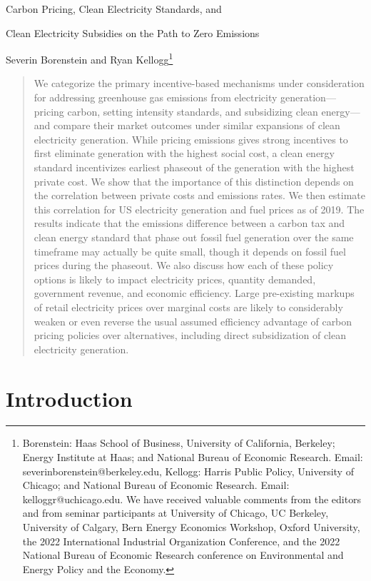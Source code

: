 \documentclass[12pt]{article}
\begin{document}
\centerline{\Large Carbon Pricing, Clean Electricity Standards, and }
\centerline{\Large Clean Electricity Subsidies on the Path to Zero Emissions}
\bigskip
\centerline{\large Severin Borenstein and Ryan Kellogg\footnote{Borenstein: Haas School of Business, University of California, Berkeley; Energy Institute at
Haas; and National Bureau of Economic Research. Email: severinborenstein@berkeley.edu, Kellogg: Harris Public Policy, University of Chicago; and National Bureau of Economic Research. Email: kelloggr@uchicago.edu. We have received valuable comments from the editors and from seminar participants at University of Chicago, UC Berkeley, University of Calgary, Bern Energy Economics Workshop, Oxford University, the 2022 International Industrial Organization Conference, and the 2022 National Bureau of Economic Research conference on Environmental and Energy Policy and the Economy.}}
\bigskip

\begin{abstract}
We categorize the primary incentive-based mechanisms under consideration for addressing greenhouse gas emissions from electricity generation---pricing carbon, setting intensity standards, and subsidizing clean energy---and compare their market outcomes under similar expansions of clean electricity generation. While pricing emissions gives strong incentives to first eliminate generation with the highest social cost, a clean energy standard incentivizes earliest phaseout of the generation with the highest private cost. We show that  the importance of this distinction depends on the correlation between private costs and emissions rates. We then estimate this correlation for US electricity generation and fuel prices as of 2019. The results indicate that the emissions difference between a carbon tax and clean energy standard that phase out fossil fuel generation over the same timeframe may actually be quite small, though it depends on fossil fuel prices during the phaseout. We also discuss how each of these policy options is likely to impact electricity prices, quantity demanded, government revenue, and economic efficiency. Large pre-existing markups of retail electricity prices over marginal costs are likely to considerably weaken or even reverse the usual assumed efficiency advantage of carbon pricing policies over alternatives, including direct subsidization of clean electricity generation.
\end{abstract}

\newpage
\section{Introduction}\label{intro}
\end{document}
